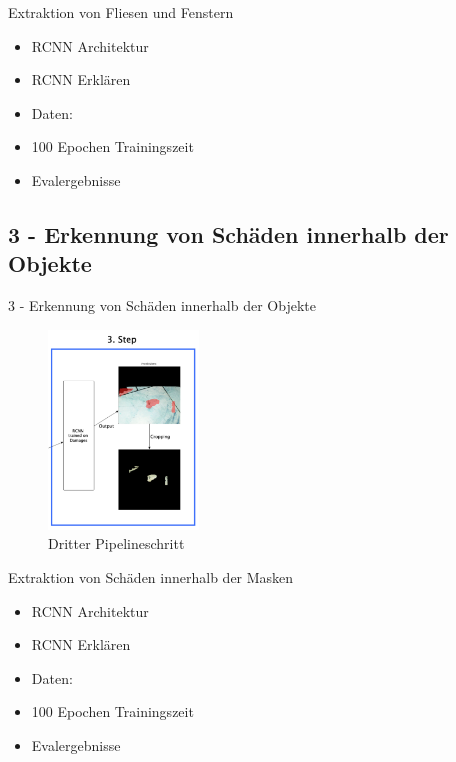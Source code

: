 \documentclass[9pt]{beamer}
\begin{document}
\begin{frame}
\begin{block}{Extraktion von Fliesen und Fenstern}
	\begin{itemize}
		\item RCNN Architektur
		\item RCNN Erklären
		\item Daten: 
		\item 100 Epochen Trainingszeit
		\item Evalergebnisse
		
	\end{itemize}
\end{block}
\end{frame}

\subsection{3 - Erkennung von Schäden innerhalb der Objekte}
\begin{frame}{3 - Erkennung von Schäden innerhalb der Objekte}
\begin{figure}
	\includegraphics[height=200px]{./fig/3}
	\caption{Dritter Pipelineschritt}
\end{figure}
\end{frame}

\begin{frame}
\begin{block}{Extraktion von Schäden innerhalb der Masken}
\begin{itemize}
	\item RCNN Architektur
	\item RCNN Erklären
	\item Daten: 
	\item 100 Epochen Trainingszeit
	\item Evalergebnisse
	
\end{itemize}
\end{block}
\end{frame}
\end{document}
